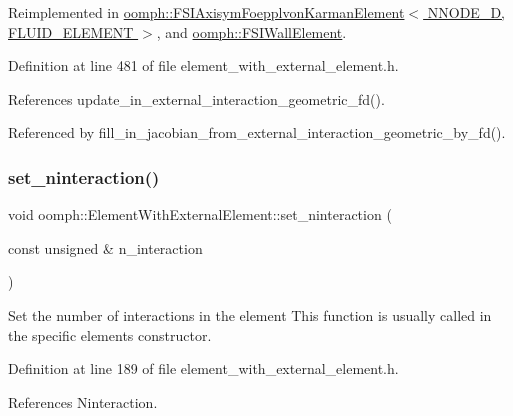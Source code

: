 Reimplemented in \hyperlink{classoomph_1_1FSIAxisymFoepplvonKarmanElement_aea15fbe491357b33db4b0de7df957314}{oomph\+::\+F\+S\+I\+Axisym\+Foepplvon\+Karman\+Element$<$ N\+N\+O\+D\+E\+\_\+D, F\+L\+U\+I\+D\+\_\+\+E\+L\+E\+M\+E\+N\+T $>$}, and \hyperlink{classoomph_1_1FSIWallElement_aa0b511d7c276578c95d26550576a9be0}{oomph\+::\+F\+S\+I\+Wall\+Element}.



Definition at line 481 of file element\+\_\+with\+\_\+external\+\_\+element.\+h.



References update\+\_\+in\+\_\+external\+\_\+interaction\+\_\+geometric\+\_\+fd().



Referenced by fill\+\_\+in\+\_\+jacobian\+\_\+from\+\_\+external\+\_\+interaction\+\_\+geometric\+\_\+by\+\_\+fd().

\mbox{\label{classoomph_1_1ElementWithExternalElement_a180b99d0cf83f3b2d90427e77b90fc96}} 
\subsubsection{\texorpdfstring{set\+\_\+ninteraction()}{set\_ninteraction()}}
{\footnotesize\ttfamily void oomph\+::\+Element\+With\+External\+Element\+::set\+\_\+ninteraction (\begin{DoxyParamCaption}\item[{const unsigned \&}]{n\+\_\+interaction }\end{DoxyParamCaption})\hspace{0.3cm}{\ttfamily [inline]}}



Set the number of interactions in the element This function is usually called in the specific element\textquotesingle{}s constructor. 



Definition at line 189 of file element\+\_\+with\+\_\+external\+\_\+element.\+h.



References Ninteraction.




